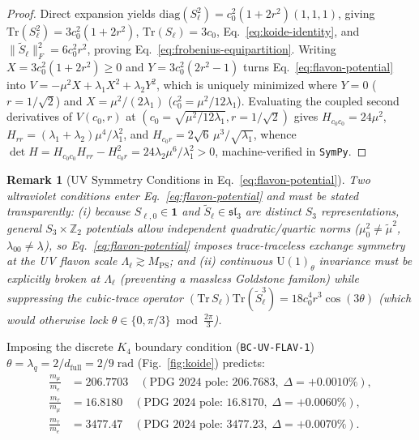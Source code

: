 \documentclass[11pt,a4paper]{article}
\newtheorem{remark}[theorem]{Remark}
\begin{document}
\begin{proof}
Direct expansion yields $\mathrm{diag}(S_\ell^2) = c_0^2(1 + 2r^2)(1,1,1)$, giving $\mathrm{Tr}(S_\ell^2) = 3c_0^2(1+2r^2)$, $\mathrm{Tr}(S_\ell) = 3c_0$, Eq.~\eqref{eq:koide-identity}, and $\|\tilde{S}_\ell\|_F^2 = 6c_0^2 r^2$, proving Eq.~\eqref{eq:frobenius-equipartition}. Writing $X = 3c_0^2(1+2r^2) \ge 0$ and $Y = 3c_0^2(2r^2 - 1)$ turns Eq.~\eqref{eq:flavon-potential} into $V = -\mu^2 X + \lambda_1 X^2 + \lambda_2 Y^2$, which is uniquely minimized where $Y = 0$ ($r = 1/\sqrt{2}$) and $X = \mu^2/(2\lambda_1)$ ($c_0^2 = \mu^2/12\lambda_1$). Evaluating the coupled second derivatives of $V(c_0, r)$ at $(c_0 = \sqrt{\mu^2/12\lambda_1}, r = 1/\sqrt{2})$ gives $H_{c_0 c_0} = 24\mu^2$, $H_{rr} = (\lambda_1 + \lambda_2)\mu^4/\lambda_1^2$, and $H_{c_0 r} = 2\sqrt{6}\,\mu^3/\sqrt{\lambda_1}$, whence $\det H = H_{c_0 c_0} H_{rr} - H_{c_0 r}^2 = 24\lambda_2\mu^6/\lambda_1^2 > 0$, machine-verified in \texttt{SymPy}.
\end{proof}

\begin{remark}[UV Symmetry Conditions in Eq.~\eqref{eq:flavon-potential}]
\label{rem:flavon-uv}
Two ultraviolet conditions enter Eq.~\eqref{eq:flavon-potential} and must be stated transparently: (i) because $S_{\ell,0} \in \mathbf{1}$ and $\tilde{S}_\ell \in \mathfrak{sl}_3$ are distinct $S_3$ representations, general $S_3\times\mathbb{Z}_2$ potentials allow independent quadratic/quartic norms ($\mu_0^2 \neq \tilde{\mu}^2$, $\lambda_{00} \neq \lambda_{\tilde{}\tilde{}}$), so Eq.~\eqref{eq:flavon-potential} imposes trace-traceless exchange symmetry at the UV flavon scale $\Lambda_\ell \gtrsim M_{\mathrm{PS}}$; and (ii) continuous $\mathrm{U}(1)_\theta$ invariance must be explicitly broken at $\Lambda_\ell$ (preventing a massless Goldstone familon) while suppressing the cubic-trace operator $(\mathrm{Tr}\,S_\ell)\mathrm{Tr}(\tilde{S}_\ell^3) = 18c_0^4 r^3 \cos(3\theta)$ (which would otherwise lock $\theta \in \{0, \pi/3\} \bmod \frac{2\pi}{3}$).
\end{remark}

Imposing the discrete $K_4$ boundary condition (\texttt{BC-UV-FLAV-1}) $\theta = \lambda_q = 2/d_{\mathrm{full}} = 2/9\;\mathrm{rad}$ (Fig.~\ref{fig:koide}) predicts:
\begin{align}
\frac{m_\mu}{m_e} &= \mathbf{206.7703} \quad (\text{PDG 2024 pole: } 206.7683,\; \Delta = +0.0010\%), \nonumber\\
\frac{m_\tau}{m_\mu} &= \mathbf{16.8180} \quad (\text{PDG 2024 pole: } 16.8170,\; \Delta = +0.0060\%), \label{eq:pole-lepton-hits}\\
\frac{m_\tau}{m_e} &= \mathbf{3477.47} \quad (\text{PDG 2024 pole: } 3477.23,\; \Delta = +0.0070\%). \nonumber
\end{align}
\end{document}
